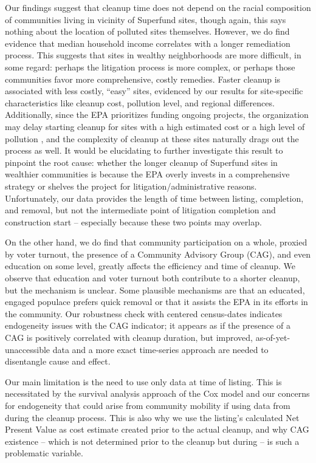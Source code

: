 \documentclass[12pt]{article}
\begin{document}
Our findings suggest that cleanup time does not depend on the racial composition of communities living in vicinity of Superfund sites, though again, this says nothing about the location of polluted sites themselves. However, we do find evidence that median household income correlates with a longer remediation process. This suggests that sites in wealthy neighborhoods are more difficult, in some regard: perhaps the litigation process is more complex, or perhaps those communities favor more comprehensive, costly remedies. Faster cleanup is associated with less costly, ``easy'' sites, evidenced by our results for site-specific characteristics like cleanup cost, pollution level, and regional differences. Additionally, since the EPA prioritizes funding ongoing projects, the organization may delay starting cleanup for sites with a high estimated cost or a high level of pollution \parencite{GAO2015}, and the complexity of cleanup at these sites naturally drags out the process as well. 
It would be elucidating to further investigate this result to pinpoint the root cause: whether the longer cleanup of Superfund sites in wealthier communities is because the EPA overly invests in a comprehensive strategy or shelves the project for litigation/administrative reasons. Unfortunately, our data provides the length of time between listing, completion, and removal, but not the intermediate point of litigation completion and construction start -- especially because these two points may overlap.

On the other hand, we do find that community participation on a whole, proxied by voter turnout, the presence of a Community Advisory Group (CAG), and even education on some level, greatly affects the efficiency and time of cleanup. We observe that education and voter turnout both contribute to a shorter cleanup, but the mechanism is unclear. Some plausible mechanisms are that an educated, engaged populace prefers quick removal or that it assists the EPA in its efforts in the community. Our robustness check with centered census-dates indicates endogeneity issues with the CAG indicator; it appears as if the presence of a CAG is positively correlated with cleanup duration, but improved, as-of-yet-unaccessible data and a more exact time-series approach are needed to disentangle cause and effect.

Our main limitation is the need to use only data at time of listing. This is necessitated by the survival analysis approach of the Cox model and our concerns for endogeneity that could arise from community mobility if using data from during the cleanup process. This is also why we use the listing's calculated Net Present Value as cost estimate created prior to the actual cleanup, and why CAG existence -- which is not determined prior to the cleanup but during -- is such a problematic variable. 
\end{document}
